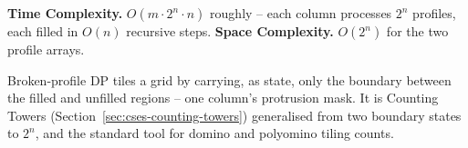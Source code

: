 \begin{complexitybox}
\textbf{Time Complexity.} $O(m\cdot 2^n\cdot n)$ roughly -- each column
processes $2^n$ profiles, each filled in $O(n)$ recursive steps.
\textbf{Space Complexity.} $O(2^n)$ for the two profile arrays.
\end{complexitybox}

\begin{takeawaybox}
Broken-profile DP tiles a grid by carrying, as state, only the boundary
between the filled and unfilled regions -- one column's protrusion mask.
It is Counting Towers (Section~\ref{sec:cses-counting-towers}) generalised
from two boundary states to $2^n$, and the standard tool for domino and
polyomino tiling counts.
\end{takeawaybox}
